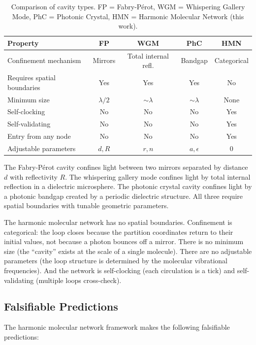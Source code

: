 \documentclass[11pt,twocolumn,a4paper]{article}
\theoremstyle{definition}
\theoremstyle{remark}
\begin{document}
\begin{table}[H]
\centering
\caption{Comparison of cavity types. FP = Fabry-P\'{e}rot, WGM = Whispering Gallery Mode, PhC = Photonic Crystal, HMN = Harmonic Molecular Network (this work).}
\label{tab:cavity_comparison}
\begin{tabular}{@{}lcccc@{}}
\toprule
Property & FP & WGM & PhC & HMN \\
\midrule
Confinement mechanism & Mirrors & Total internal refl. & Bandgap & Categorical \\
Requires spatial boundaries & Yes & Yes & Yes & No \\
Minimum size & $\lambda/2$ & $\sim \lambda$ & $\sim \lambda$ & None \\
Self-clocking & No & No & No & Yes \\
Self-validating & No & No & No & Yes \\
Entry from any node & No & No & No & Yes \\
Adjustable parameters & $d, R$ & $r, n$ & $a, \epsilon$ & 0 \\
\bottomrule
\end{tabular}
\end{table}

The Fabry-P\'{e}rot cavity \citep{fabry1899, siegman1986} confines light between two mirrors separated by distance $d$ with reflectivity $R$. The whispering gallery mode \citep{vahala2003} confines light by total internal reflection in a dielectric microsphere. The photonic crystal cavity \citep{noda2007, joannopoulos2008} confines light by a photonic bandgap created by a periodic dielectric structure. All three require spatial boundaries with tunable geometric parameters.

The harmonic molecular network has no spatial boundaries. Confinement is categorical: the loop closes because the partition coordinates return to their initial values, not because a photon bounces off a mirror. There is no minimum size (the ``cavity'' exists at the scale of a single molecule). There are no adjustable parameters (the loop structure is determined by the molecular vibrational frequencies). And the network is self-clocking (each circulation is a tick) and self-validating (multiple loops cross-check).

\subsection{Falsifiable Predictions}

The harmonic molecular network framework makes the following falsifiable predictions:
\end{document}
